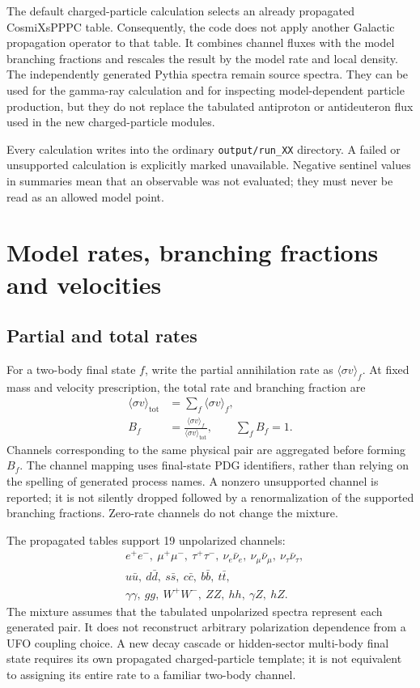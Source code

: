 \documentclass[11pt,a4paper]{article}
\newcommand{\sv}{\langle\sigma v\rangle}
\begin{document}
The default charged-particle calculation selects an already propagated CosmiXsPPPC table. Consequently, the code does not apply another Galactic propagation operator to that table. It combines channel fluxes with the model branching fractions and rescales the result by the model rate and local density. The independently generated Pythia spectra remain source spectra. They can be used for the gamma-ray calculation and for inspecting model-dependent particle production, but they do not replace the tabulated antiproton or antideuteron flux used in the new charged-particle modules.

Every calculation writes into the ordinary \texttt{output/run\_XX} directory. A failed or unsupported calculation is explicitly marked unavailable. Negative sentinel values in summaries mean that an observable was not evaluated; they must never be read as an allowed model point.

\section{Model rates, branching fractions and velocities}
\subsection{Partial and total rates}
For a two-body final state $f$, write the partial annihilation rate as $\sv_f$. At fixed mass and velocity prescription, the total rate and branching fraction are
\begin{align}
\sv_{\mathrm{tot}} &= \sum_f \sv_f,\\
B_f &= \frac{\sv_f}{\sv_{\mathrm{tot}}}, \qquad \sum_f B_f=1.
\end{align}
Channels corresponding to the same physical pair are aggregated before forming $B_f$. The channel mapping uses final-state PDG identifiers, rather than relying on the spelling of generated process names. A nonzero unsupported channel is reported; it is not silently dropped followed by a renormalization of the supported branching fractions. Zero-rate channels do not change the mixture.

The propagated tables support 19 unpolarized channels:
\begin{align}
&e^+e^-,\ \mu^+\mu^-,\ \tau^+\tau^-,\ \nu_e\bar\nu_e,\ \nu_\mu\bar\nu_\mu,\ \nu_\tau\bar\nu_\tau,\\
&u\bar u,\ d\bar d,\ s\bar s,\ c\bar c,\ b\bar b,\ t\bar t,\\
&\gamma\gamma,\ gg,\ W^+W^-,\ ZZ,\ hh,\ \gamma Z,\ hZ.
\end{align}
The mixture assumes that the tabulated unpolarized spectra represent each generated pair. It does not reconstruct arbitrary polarization dependence from a UFO coupling choice. A new decay cascade or hidden-sector multi-body final state requires its own propagated charged-particle template; it is not equivalent to assigning its entire rate to a familiar two-body channel.
\end{document}
